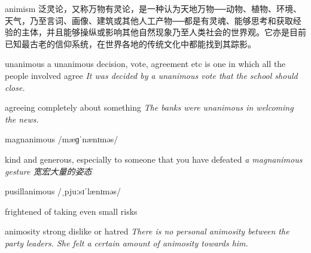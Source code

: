 \begin{DefWord}{animism}
    泛灵论，又称万物有灵论，是一种认为天地万物──动物、植物、环境、天气，乃至言词、画像、建筑或其他人工产物──都是有灵魂、能够思考和获取经验的主体，并且能够操纵或影响其他自然现象乃至人类社会的世界观。它亦是目前已知最古老的信仰系统，在世界各地的传统文化中都能找到其踪影。
\end{DefWord}

\begin{DefWord}{unanimous}
    a unanimous decision, vote, agreement etc is one in which all the people involved agree
    \textit{It was decided by a unanimous vote that the school should close.}

    agreeing completely about something
    \textit{The banks were unanimous in welcoming the news.}
\end{DefWord}

\begin{DefWord}{magnanimous}
    /mæɡˈnænɪməs/

    kind and generous, especially to someone that you have defeated
    \textit{a magnanimous gesture 宽宏大量的姿态}
\end{DefWord}

\begin{DefWord}{pusillanimous}
    /ˌpjuːsɪˈlænɪməs/
    
    frightened of taking even small risks
\end{DefWord}

\begin{DefWord}{animosity}
    strong dislike or hatred
    \textit{There is no personal animosity between the party leaders. She felt a certain amount of animosity towards him.}
\end{DefWord}
